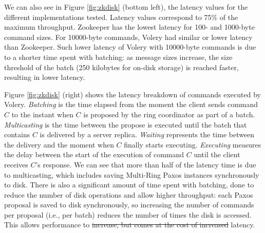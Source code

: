 \documentclass[10pt, conference, compsocconf, letterpaper]{IEEEtranv17}
\providecommand{\DIFadd}[1]{{\protect\color{blue}\uwave{#1}}} %
\providecommand{\DIFdel}[1]{{\protect\color{red}\sout{#1}}}                      %
\providecommand{\DIFaddbegin}{} %
\providecommand{\DIFaddend}{} %
\providecommand{\DIFdelbegin}{} %
\providecommand{\DIFdelend}{} %
\begin{document}
We can also see in Figure \ref{fig:zkdisk} (bottom left), the latency values for the different implementations tested. 
Latency values correspond to 75\% of the maximum throughput.
Zookeeper has the lowest latency for 100- and 1000-byte command sizes. 
For 10000-byte commands, Volery had similar or lower latency than Zookeeper. 
Such lower latency of Volery with 10000-byte commands is due to a shorter time spent with batching: as message sizes increase, the size threshold of the batch (250 kilobytes for on-disk storage) is reached faster, resulting in lower latency. %

Figure \ref{fig:zkdisk} (right) shows the latency breakdown of commands executed by Volery.
\emph{Batching} is the time elapsed from the moment the client sends command $C$ to the instant when $C$ is proposed by the ring coordinator as part of a batch. 
\emph{Multicasting} is the time between the propose is executed until the batch that contains $C$ is delivered by a server replica. 
\emph{Waiting} represents the time between the delivery and the moment when $C$ finally starts executing.
\emph{Executing} measures the delay between the start of the execution of command $C$ until the client receives $C$'s response.
We can see that more than half of the latency time is due to multicasting, which includes saving Multi-Ring Paxos instances synchronously to disk. 
There is also a significant amount of time spent with batching, done to reduce the number of disk operations and allow higher throughput: each Paxos proposal is saved to disk synchronously, so increasing the number of commands per proposal (i.e., per batch) reduces the number of times the disk is accessed.
This allows performance to \DIFdelbegin \DIFdel{increase, but comes at the cost of increased }\DIFdelend \DIFaddbegin \DIFadd{improve, but increases }\DIFaddend latency.

\end{document}
